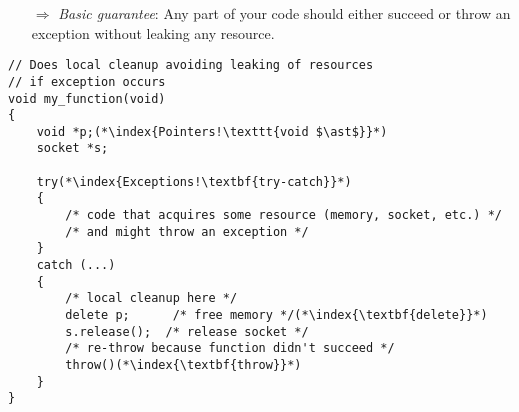 \documentclass[10pt]{article}
\begin{document}
\begin{enumerate}
\item[$\Rightarrow$] \emph{Basic guarantee}: Any part of your code should either succeed or throw an exception without leaking any resource.
\end{enumerate}
\begin{lstlisting}
// Does local cleanup avoiding leaking of resources
// if exception occurs
void my_function(void)
{
    void *p;(*\index{Pointers!\texttt{void $\ast$}}*) 
    socket *s;
    
    try(*\index{Exceptions!\textbf{try-catch}}*)
    {
        /* code that acquires some resource (memory, socket, etc.) */
        /* and might throw an exception */
    }
    catch (...)
    { 
        /* local cleanup here */
        delete p;      /* free memory */(*\index{\textbf{delete}}*)
        s.release();  /* release socket */  
        /* re-throw because function didn't succeed */
        throw()(*\index{\textbf{throw}}*)
    }    
}
\end{lstlisting}
%
%
\end{document}
